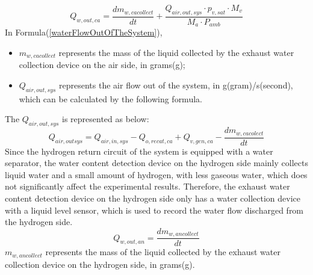 \begin{equation}
	\label{waterFlowOutOfTheSystem}
	Q_{w,out,ca}={\frac{d m_{w,cacollect}}{d t}}+{\frac{Q_{air,out,sys} \cdot p_{v,sat}\cdot M_{v}}{M_{a} \cdot P_{a m b}}}
\end{equation}
In Formula(\ref{waterFlowOutOfTheSystem}),
\begin{itemize}
	\item $m_{w,cacollect}$ represents the mass of the liquid collected by the exhaust water collection device on the air side, in grams(g);
	\item $Q_{air,out,sys}$ represents the air flow out of the system, in g(gram)/s(second), which can be calculated by the following formula.
\end{itemize}
The $Q_{air,out,sys}$ is represented as below:
\begin{equation}
	\label{airFlowOutOfTheSystem}
	Q_{air,outsys}=Q_{air,in,sys}-Q_{o,recat,ca}+Q_{v,gen,ca}-{\frac{dm_{w,cacolect}}{dt}}
\end{equation}
Since the hydrogen return circuit of the system is equipped with a water separator, the water content detection device on the hydrogen side mainly collects liquid water and a small amount of hydrogen, with less gaseous water, which does not significantly affect the experimental results. Therefore, the exhaust water content detection device on the hydrogen side only has a water collection device with a liquid level sensor, which is used to record the water flow discharged from the hydrogen side.
\begin{equation}
	Q_{w,out,an}={\frac{dm_{w,ancollect}}{dt}}
\end{equation}
$m_{w,ancollect}$ represents the mass of the liquid collected by the exhaust water collection device on the hydrogen side, in grams(g).

